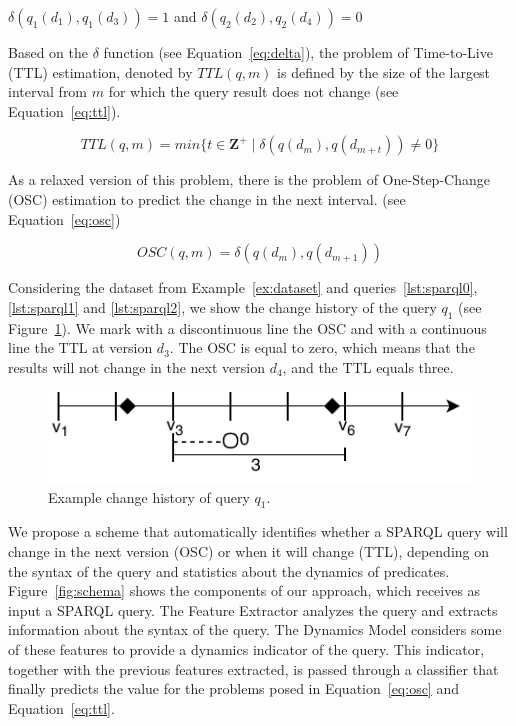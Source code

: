 \documentclass[runningheads]{llncs}
\begin{document}
$\delta(q_1(d_1), q_1(d_3)) = 1$ and $\delta(q_2(d_2), q_2(d_4)) = 0$

Based on the $\delta$ function (see Equation~\ref{eq:delta}), the problem of Time-to-Live (TTL) estimation, denoted by $TTL(q,m)$ is defined by the size of the largest interval from $m$ for which the query result does not change (see Equation~\ref{eq:ttl}).

\begin{equation}
\label{eq:ttl}
TTL(q,m)=min\{t \in \mathbf{Z}^+ \mid \delta(q(d_m), q(d_{m+t})) \neq 0 \}
\end{equation}

As a relaxed version of this problem, there is the problem of One-Step-Change (OSC) estimation to predict the change in the next interval. (see Equation~\ref{eq:osc})

\begin{equation}
\label{eq:osc}
OSC(q,m) = \delta(q(d_m), q(d_{m+1}))
\end{equation}

Considering the dataset from Example~\ref{ex:dataset} and queries~\ref{lst:sparql0}, \ref{lst:sparql1} and \ref{lst:sparql2}, we show the change history of the query $q_1$ (see Figure~\ref{fig:problem}). We mark with a discontinuous line the OSC and with a continuous line the TTL at version $ d_3 $. The OSC is equal to zero, which means that the results will not change in the next version $d_4$, and the TTL equals three.

\begin{figure}[h]
	\centering
	\includegraphics[width=0.7\linewidth]{img/problem.pdf}
	\caption{Example change history of query $q_1$.}
	\label{fig:problem}
\end{figure}

We propose a scheme that automatically identifies whether a SPARQL query will change in the next version (OSC) or when it will change (TTL), depending on the syntax of the query and statistics about the dynamics of predicates. Figure~\ref{fig:schema} shows the components of our approach, which receives as input a SPARQL query. The Feature Extractor analyzes the query and extracts information about the syntax of the query. The Dynamics Model considers some of these features to provide a dynamics indicator of the query. This indicator, together with the previous features extracted, is passed through a classifier that finally predicts the value for the problems posed in Equation~\ref{eq:osc} and Equation~\ref{eq:ttl}.
\end{document}
